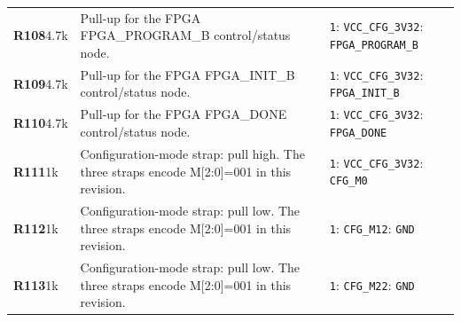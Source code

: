 \documentclass[11pt,a4paper]{article}
\begin{document}
\begin{longtable}{@{}P{27mm}P{84mm}P{57mm}@{}}
\textbf{R108}\newline 4.7k & Pull-up for the FPGA FPGA\_PROGRAM\_B control/status node. & \nolinkurl{1}: \nolinkurl{VCC_CFG_3V3}\newline \nolinkurl{2}: \nolinkurl{FPGA_PROGRAM_B} \\
\textbf{R109}\newline 4.7k & Pull-up for the FPGA FPGA\_INIT\_B control/status node. & \nolinkurl{1}: \nolinkurl{VCC_CFG_3V3}\newline \nolinkurl{2}: \nolinkurl{FPGA_INIT_B} \\
\textbf{R110}\newline 4.7k & Pull-up for the FPGA FPGA\_DONE control/status node. & \nolinkurl{1}: \nolinkurl{VCC_CFG_3V3}\newline \nolinkurl{2}: \nolinkurl{FPGA_DONE} \\
\textbf{R111}\newline 1k & Configuration-mode strap: pull high. The three straps encode M[2:0]=001 in this revision. & \nolinkurl{1}: \nolinkurl{VCC_CFG_3V3}\newline \nolinkurl{2}: \nolinkurl{CFG_M0} \\
\textbf{R112}\newline 1k & Configuration-mode strap: pull low. The three straps encode M[2:0]=001 in this revision. & \nolinkurl{1}: \nolinkurl{CFG_M1}\newline \nolinkurl{2}: \nolinkurl{GND} \\
\textbf{R113}\newline 1k & Configuration-mode strap: pull low. The three straps encode M[2:0]=001 in this revision. & \nolinkurl{1}: \nolinkurl{CFG_M2}\newline \nolinkurl{2}: \nolinkurl{GND} \\

\end{longtable}
\end{document}
